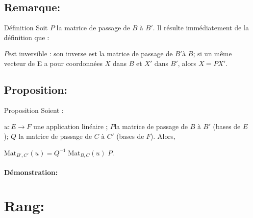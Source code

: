 \documentclass{book}
\begin{document}
\subsection{Remarque: }
\begin{Définition}[]{Définition}{}
Soit ${\displaystyle P}$ la matrice de passage de ${\displaystyle B}$ à ${\displaystyle B'}$. Il résulte immédiatement de la définition que :

${\displaystyle P} $est inversible : son inverse est la matrice de passage de ${\displaystyle B'}$à ${\displaystyle B} $;
si un même vecteur de E a pour coordonnées ${\displaystyle X}$ dans ${\displaystyle B}$ et ${\displaystyle X'}$ dans ${\displaystyle B'}$, alors ${\displaystyle X=PX'}$.
\end{Définition}
\subsection{Proposition: }
\begin{Propriété}[]{Proposition}{}
Soient :

${\displaystyle u:E\to F}$ une application linéaire ;
${\displaystyle P} $la matrice de passage de ${\displaystyle B}$ à ${\displaystyle B'}$ (bases de ${\displaystyle E}$);
${\displaystyle Q}$ la matrice de passage de ${\displaystyle C}$ à ${\displaystyle C'}$ (bases de ${\displaystyle F}$).
Alors,

${\displaystyle \mathrm {Mat} _{B',C'}(u)=Q^{-1}\;\mathrm {Mat} _{B,C}(u)\;P}$.
\end{Propriété}
\paragraph{Démonstration: }
\section{Rang: }
\end{document}
